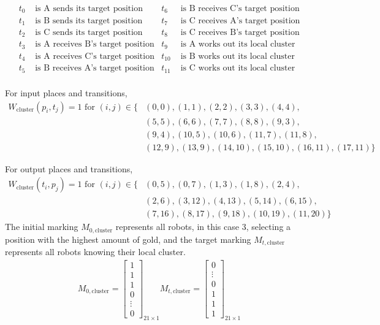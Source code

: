 \documentclass[12pt,a4paper]{article}
\begin{document}
\begin{align*}
    t_0  &\text{ is A sends its target position}              & t_{6} &\text{ is B receives C's target position} \\
    t_1  &\text{ is B sends its target position}              & t_{7} &\text{ is C receives A's target position} \\
    t_2  &\text{ is C sends its target position}              & t_{8} &\text{ is C receives B's target position} \\
    t_3  &\text{ is A receives B's target position}                     & t_{9} &\text{ is A works out its local cluster} \\
    t_4  &\text{ is A receives C's target position}                     & t_{10} &\text{ is B works out its local cluster} \\
    t_5  &\text{ is B receives A's target position}                     & t_{11} &\text{ is C works out its local cluster} \\
\end{align*}

For input places and transitions,
\begin{align*}
  W_{\text{cluster}}(p_i, t_j) = 1 \text{ for } (i, j) \in 
\{&(0, 0), (1, 1), (2, 2), (3, 3), (4, 4), \\
  &(5, 5), (6, 6), (7, 7), (8, 8), (9, 3), \\
  &(9, 4), (10, 5), (10, 6), (11, 7), (11, 8), \\
  &(12, 9), (13, 9), (14, 10), (15, 10), (16, 11), (17, 11)\}
\end{align*}

For output places and transitions,
\begin{align*}
  W_{\text{cluster}}(t_i, p_j) = 1 \text{ for } (i, j) \in 
\{&(0, 5), (0, 7), (1, 3), (1, 8), (2, 4), \\
  &(2, 6), (3, 12), (4, 13), (5, 14), (6, 15), \\
  &(7, 16), (8, 17), (9, 18), (10, 19), (11, 20)\}
\end{align*}
The initial marking $M_{0, \text{cluster}}$ represents all robots, in this case 3, selecting a position with the highest amount of gold, and the target marking $M_{t, \text{cluster}}$ represents all robots knowing their local cluster.
\begin{align*}
    M_{0, \text{cluster}} = \begin{bmatrix}
        1 \\ 1 \\ 1 \\ 0 \\ \vdots \\ 0
    \end{bmatrix}_{21 \times 1}
    M_{t, \text{cluster}} = \begin{bmatrix}
        0 \\ \vdots \\ 0 \\ 1 \\ 1 \\ 1
    \end{bmatrix}_{21 \times 1}
\end{align*}
\end{document}
